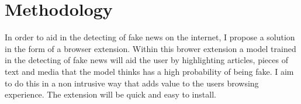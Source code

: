 \chapter{Methodology}

In order to aid in the detecting of fake news on the internet, I propose a solution in the form of a browser extension. Within this brower extension a model trained in the detecting of fake news 
will aid the user by highlighting articles, pieces of text and media that the model thinks has a high probability of being fake. I aim to do this in a non intrusive way that adds value to the users
browsing experience. The extension will be quick and easy to install.

